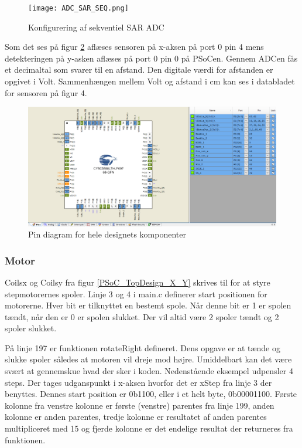 \begin{figure}[H]
\texttt{[image: ADC\_SAR\_SEQ.png]}
\caption{Konfigurering af sekventiel SAR ADC}
\label{ADC_SAR_SEQ}
\end{figure}

Som det ses på figur \ref{PSoC_X_Y_pin_configuration} aflæses sensoren på x-aksen på port 0 pin 4 mens detekteringen på y-asken aflæses på port 0 pin 0 på PSoCen. Gennem ADCen fås et decimaltal som svarer til en afstand. Den digitale værdi for afstanden er opgivet i Volt. Sammenhængen mellem Volt og afstand i cm kan ses i databladet for sensoren på figur 4.

\begin{figure}[H]
\includegraphics[scale=0.22]{PSoC_X_Y_pin_configuration.png}
\caption{Pin diagram for hele designets komponenter}
\label{PSoC_X_Y_pin_configuration}
\end{figure}

\subsubsection{Motor}
Coils\textunderscore x og Coils\textunderscore y fra figur \ref{PSoC_TopDesign_X_Y} skrives til for at styre stepmotorernes spoler. Linje 3 og 4 i main.c definerer start positionen for motorerne. Hver bit er tilknyttet en bestemt spole. Når denne bit er 1 er spolen tændt, når den er 0 er spolen slukket. Der vil altid være 2 spoler tændt og 2 spoler slukket.

På linje 197 er funktionen rotateRight defineret. Dens opgave er at tænde og slukke spoler således at motoren vil dreje mod højre. Umiddelbart kan det være svært at gennemskue hvad der sker i koden. Nedenstående eksempel udpensler 4 steps. Der tages udganspunkt i x-aksen hvorfor det er xStep fra linje 3 der benyttes. Dennes start position er 0b1100, eller i et helt byte, 0b00001100. Første kolonne fra venstre kolonne er første (venstre) parentes fra linje 199, anden kolonne er anden parentes, tredje kolonne er resultatet af anden parentes multipliceret med 15 og fjerde kolonne er det endelige resultat der returneres fra funktionen.

